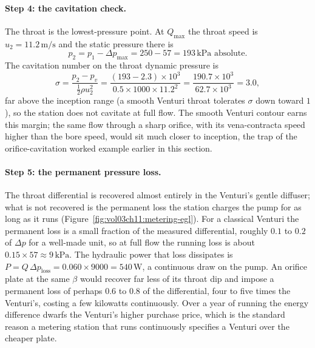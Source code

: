 \paragraph{Step 4: the cavitation check.} The throat is the
lowest-pressure point. At $Q_\text{max}$ the throat speed is $u_2 =
11.2\,\si{\meter\per\second}$ and the static pressure there is
\[
p_2 = p_1 - \Delta p_\text{max} = 250 - 57 = 193\,\text{kPa absolute}.
\]
The cavitation number on the throat dynamic pressure is
\[
\sigma = \frac{p_2 - p_v}{\tfrac12\rho u_2^2}
= \frac{(193 - 2.3)\times 10^3}{0.5\times 1000\times 11.2^2}
= \frac{190.7\times 10^3}{62.7\times 10^3} = 3.0,
\]
far above the inception range (a smooth Venturi throat tolerates
$\sigma$ down toward $1$), so the station does not cavitate at full
flow. The smooth Venturi contour earns this margin; the same flow
through a sharp orifice, with its vena-contracta speed higher than the
bore speed, would sit much closer to inception, the trap of the
orifice-cavitation worked example earlier in this section.

\paragraph{Step 5: the permanent pressure loss.} The throat
differential is recovered almost entirely in the Venturi's gentle
diffuser; what is not recovered is the permanent loss the station
charges the pump for as long as it runs
(Figure~\ref{fig:vol03ch11:metering-egl}). For a classical Venturi the
permanent loss is a small fraction of the measured differential,
roughly $0.1$ to $0.2$ of $\Delta p$ for a well-made unit, so at full
flow the running loss is about $0.15\times 57 \approx 9\,\text{kPa}$.
The hydraulic power that loss dissipates is $P = Q\,\Delta p_\text{loss}
= 0.060\times 9000 = 540\,\si{\watt}$, a continuous draw on the pump. An
orifice plate at the same $\beta$ would recover far less of its throat
dip and impose a permanent loss of perhaps $0.6$ to $0.8$ of the
differential, four to five times the Venturi's, costing a few kilowatts
continuously. Over a year of running the energy difference dwarfs the
Venturi's higher purchase price, which is the standard reason a
metering station that runs continuously specifies a Venturi over the
cheaper plate.

